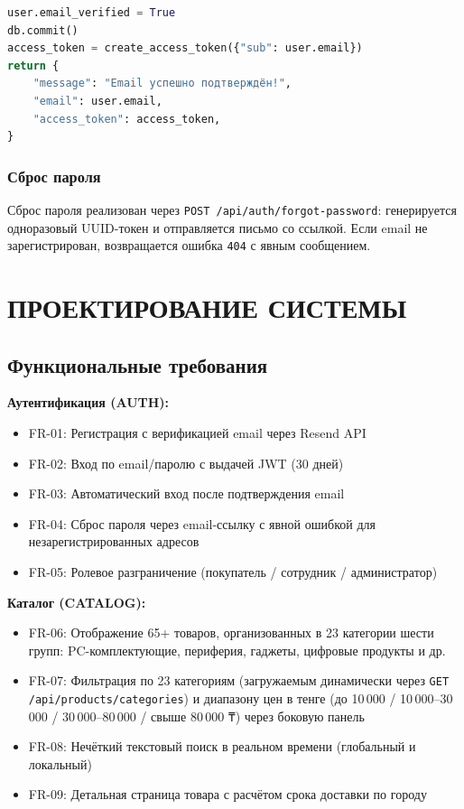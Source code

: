 \documentclass[14pt,a4paper]{extreport}
\begin{document}
\begin{lstlisting}[language=Python, caption={Возврат JWT при верификации email}]
user.email_verified = True
db.commit()
access_token = create_access_token({"sub": user.email})
return {
    "message": "Email успешно подтверждён!",
    "email": user.email,
    "access_token": access_token,
}
\end{lstlisting}

\subsection{Сброс пароля}

Сброс пароля реализован через \texttt{POST /api/auth/forgot-password}: генерируется одноразовый UUID-токен и отправляется письмо со ссылкой. Если email не зарегистрирован, возвращается ошибка \texttt{404} с явным сообщением.

\chapter{ПРОЕКТИРОВАНИЕ СИСТЕМЫ}

\section{Функциональные требования}

\textbf{Аутентификация (AUTH):}
\begin{itemize}
  \item FR-01: Регистрация с верификацией email через Resend API
  \item FR-02: Вход по email/паролю с выдачей JWT (30 дней)
  \item FR-03: Автоматический вход после подтверждения email
  \item FR-04: Сброс пароля через email-ссылку с явной ошибкой для незарегистрированных адресов
  \item FR-05: Ролевое разграничение (покупатель / сотрудник / администратор)
\end{itemize}

\textbf{Каталог (CATALOG):}
\begin{itemize}
  \item FR-06: Отображение 65+ товаров, организованных в 23 категории шести групп: PC-комплектующие, периферия, гаджеты, цифровые продукты и др.
  \item FR-07: Фильтрация по 23 категориям (загружаемым динамически через \texttt{GET /api/products/categories}) и диапазону цен в тенге (до 10\,000 / 10\,000--30\,000 / 30\,000--80\,000 / свыше 80\,000 ₸) через боковую панель
  \item FR-08: Нечёткий текстовый поиск в реальном времени (глобальный и локальный)
  \item FR-09: Детальная страница товара с расчётом срока доставки по городу
\end{itemize}
\end{document}
